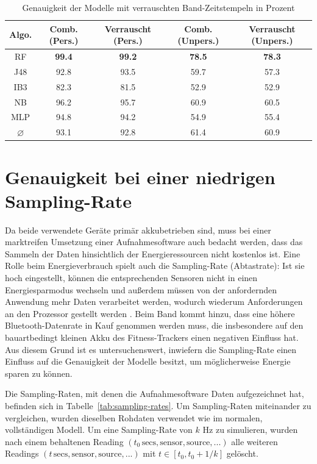 \begin{table}
\centering
\begin{tabular}{|c|c|c||c|c|}
	\hline 
	\textbf{Algo.} & \textbf{Comb. (Pers.)} & \textbf{Verrauscht (Pers.)} &\textbf{Comb. (Unpers.)} & \textbf{Verrauscht (Unpers.)} \\ 
	\hline 
	RF & \textbf{99.4} & \textbf{99.2} & \textbf{78.5} & \textbf{78.3} \\ 
	J48 & 92.8 & 93.5 & 59.7 & 57.3 \\ 
	IB3 & 82.3 & 81.5 & 52.9 & 52.9 \\ 
	NB & 96.2 & 95.7 & 60.9 & 60.5 \\ 
	MLP & 94.8 & 94.2 & 54.9 & 55.4 \\ 
	\hline 
	$\varnothing$ & 93.1 & 92.8 & 61.4 & 60.9 \\ 
	\hline
\end{tabular} 
\caption{Genauigkeit der Modelle mit verrauschten Band-Zeitstempeln in Prozent}
\label{tab:accuracy-noisy_timestamps}
\end{table}

\section{Genauigkeit bei einer niedrigen Sampling-Rate}
\label{sec:lower-sampling-rate}
Da beide verwendete Geräte primär akkubetrieben sind, muss bei einer marktreifen Umsetzung einer Aufnahmesoftware auch bedacht werden, dass das Sammeln der Daten hinsichtlich der Energieressourcen nicht kostenlos ist. Eine Rolle beim Energieverbrauch spielt auch die Sampling-Rate (Abtastrate): Ist sie hoch eingestellt, können die entsprechenden Sensoren nicht in einen Energiesparmodus wechseln und außerdem müssen von der anfordernden Anwendung mehr Daten verarbeitet werden, wodurch wiederum Anforderungen an den Prozessor gestellt werden \cite{Krause2005}. Beim Band kommt hinzu, dass eine höhere Bluetooth-Datenrate in Kauf genommen werden muss, die insbesondere auf den bauartbedingt kleinen Akku des Fitness-Trackers einen negativen Einfluss hat. Aus diesem Grund ist es untersuchenswert, inwiefern die Sampling-Rate einen Einfluss auf die Genauigkeit der Modelle besitzt, um möglicherweise Energie sparen zu können.

Die Sampling-Raten, mit denen die Aufnahmesoftware Daten aufgezeichnet hat, befinden sich in Tabelle~\ref{tab:sampling-rates}. Um Sampling-Raten miteinander zu vergleichen, wurden dieselben Rohdaten verwendet wie im normalen, vollständigen Modell. Um eine Sampling-Rate von $k$ Hz zu simulieren, wurden nach einem behaltenen Reading $(t_0\,\text{secs}, \text{sensor}, \text{source}, ...)$ alle weiteren Readings $(t\,\text{secs}, \text{sensor}, \text{source}, ...)$ mit $t \in [t_0, t_0 + 1/k]$ gelöscht.

